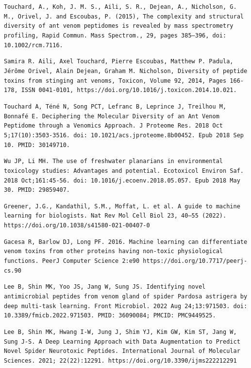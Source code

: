 \documentclass{article}
\begin{document}
		\begin{thebibliography}{99}  
			\texttt{Touchard, A., Koh, J. M. S., Aili, S. R., Dejean, A., Nicholson, G. M., Orivel, J. and Escoubas, P. (2015), The complexity and structural diversity of ant venom peptidomes is revealed by mass spectrometry profiling, Rapid Commun. Mass Spectrom., 29, pages 385–396, doi: 10.1002/rcm.7116.}
			
			\texttt{Samira R. Aili, Axel Touchard, Pierre Escoubas, Matthew P. Padula, Jérôme Orivel, Alain Dejean, Graham M. Nicholson, Diversity of peptide toxins from stinging ant venoms, Toxicon, Volume 92, 2014, Pages 166-178, ISSN 0041-0101, https://doi.org/10.1016/j.toxicon.2014.10.021.}
			
			\texttt{Touchard A, Téné N, Song PCT, Lefranc B, Leprince J, Treilhou M, Bonnafé E. Deciphering the Molecular Diversity of an Ant Venom Peptidome through a Venomics Approach. J Proteome Res. 2018 Oct 5;17(10):3503-3516. doi: 10.1021/acs.jproteome.8b00452. Epub 2018 Sep 10. PMID: 30149710.}
			
			\texttt{Wu JP, Li MH. The use of freshwater planarians in environmental toxicology studies: Advantages and potential. Ecotoxicol Environ Saf. 2018 Oct;161:45-56. doi: 10.1016/j.ecoenv.2018.05.057. Epub 2018 May 30. PMID: 29859407.}
			
			\texttt{Greener, J.G., Kandathil, S.M., Moffat, L. et al. A guide to machine learning for biologists. Nat Rev Mol Cell Biol 23, 40–55 (2022). https://doi.org/10.1038/s41580-021-00407-0}
			
			\texttt{Gacesa R, Barlow DJ, Long PF. 2016. Machine learning can differentiate venom toxins from other proteins having non-toxic physiological functions. PeerJ Computer Science 2:e90 https://doi.org/10.7717/peerj-cs.90}
			
			\texttt{Lee B, Shin MK, Yoo JS, Jang W, Sung JS. Identifying novel antimicrobial peptides from venom gland of spider Pardosa astrigera by deep multi-task learning. Front Microbiol. 2022 Aug 24;13:971503. doi: 10.3389/fmicb.2022.971503. PMID: 36090084; PMCID: PMC9449525.}
			
			\texttt{Lee B, Shin MK, Hwang I-W, Jung J, Shim YJ, Kim GW, Kim ST, Jang W, Sung J-S. A Deep Learning Approach with Data Augmentation to Predict Novel Spider Neurotoxic Peptides. International Journal of Molecular Sciences. 2021; 22(22):12291. https://doi.org/10.3390/ijms222212291}
		\end{thebibliography}
		
	
\end{document}
